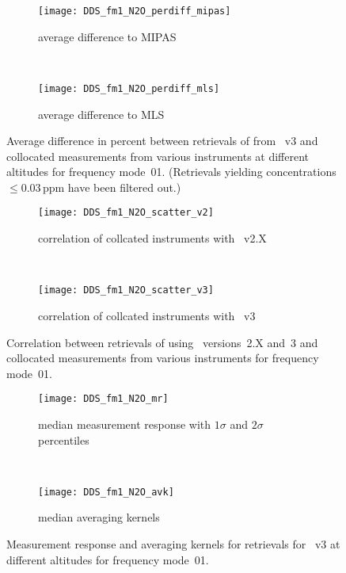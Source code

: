 \begin{figure}[tbhp]
    \centering
    \begin{subfigure}[b]{0.49\textwidth}
        \texttt{[image: DDS\_fm1\_N2O\_perdiff\_mipas]}
        \caption{average difference to MIPAS}
        \label{fig:fm01:N2O:profiles:MIPAS}
    \end{subfigure}
    \,
    \begin{subfigure}[b]{0.49\textwidth}
        \texttt{[image: DDS\_fm1\_N2O\_perdiff\_mls]}
        \caption{average difference to MLS}
        \label{fig:fm01:N2O:profiles:MLS}
    \end{subfigure}
    \caption{Average difference in percent between retrievals of 
    from \smr~v3 and collocated measurements from various instruments at
    different altitudes for frequency mode~01. (Retrievals yielding
    concentrations $\leq 0.03\,\mathrm{ppm}$ have been filtered out.)}
    \label{fig:fm01:N2O:profiles}
\end{figure}

\begin{figure}[tbhp]
    \centering
    \begin{subfigure}[b]{0.49\textwidth}
        \texttt{[image: DDS\_fm1\_N2O\_scatter\_v2]}
        \caption{correlation of collcated instruments with \smr~v2.X}
        \label{fig:fm01:N2O:scatter:v2}
    \end{subfigure}
    \,
    \begin{subfigure}[b]{0.49\textwidth}
        \texttt{[image: DDS\_fm1\_N2O\_scatter\_v3]}
        \caption{correlation of collcated instruments with \smr~v3}
        \label{fig:fm01:N2O:scatter:v3}
    \end{subfigure}
    \caption{Correlation between retrievals of  using \smr\
    versions~2.X and~3 and collocated measurements from various instruments
    for frequency mode~01.}
    \label{fig:fm01:N2O:scatter}
\end{figure}

\begin{figure}[tbhp]
    \centering
    \begin{subfigure}[b]{0.49\textwidth}
        \texttt{[image: DDS\_fm1\_N2O\_mr]}
        \caption{median measurement response with $1\sigma$ and $2\sigma$
        percentiles}
        \label{fig:fm01:N2O:mr}
    \end{subfigure}
    \,
    \begin{subfigure}[b]{0.49\textwidth}
        \texttt{[image: DDS\_fm1\_N2O\_avk]}
        \caption{median averaging kernels\newline~}
        \label{fig:fm01:N2O:avk}
    \end{subfigure}
    \caption{Measurement response and averaging kernels for 
    retrievals for \smr~v3 at different altitudes for frequency mode~01.}
    \label{fig:fm01:N2O:mr_avk}
\end{figure}



